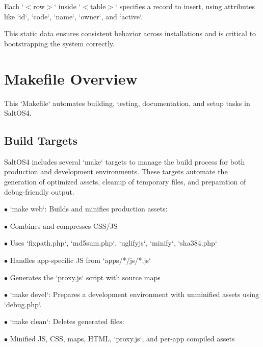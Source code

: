 \documentclass[a4paper]{article}
\begin{document}
Each `$<$row$>$` inside `$<$table$>$` specifies a record to insert, using attributes like `id`, `code`, `name`, `owner`, and `active`.

This static data ensures consistent behavior across installations and is critical to bootstrapping the system correctly.


\hypertarget{toc41}{}
\section{Makefile Overview}

This `Makefile` automates building, testing, documentation, and setup tasks in SaltOS4.

\hypertarget{toc42}{}
\subsection{Build Targets}

SaltOS4 includes several `make` targets to manage the build process for both production and development environments. These targets automate the generation of optimized assets, cleanup of temporary files, and preparation of debug-friendly output.

\begin{compactitem}
\item[\color{myblue}$\bullet$] `make web`: Builds and minifies production assets:
  \begin{compactitem}
  \item[\color{myblue}$\bullet$] Combines and compresses CSS/JS
  \item[\color{myblue}$\bullet$] Uses `fixpath.php`, `md5sum.php`, `uglifyjs`, `minify`, `sha384.php`
  \item[\color{myblue}$\bullet$] Handles app-specific JS from `apps/*/js/*.js`
  \item[\color{myblue}$\bullet$] Generates the `proxy.js` script with source maps
  \end{compactitem}
\item[\color{myblue}$\bullet$] `make devel`: Prepares a development environment with unminified assets using `debug.php`.
\item[\color{myblue}$\bullet$] `make clean`: Deletes generated files:
  \begin{compactitem}
  \item[\color{myblue}$\bullet$] Minified JS, CSS, maps, HTML, `proxy.js`, and per-app compiled assets
  \end{compactitem}
\end{compactitem}
\end{document}
